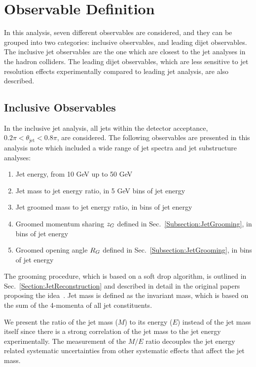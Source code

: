 \section{Observable Definition}\label{Section:Observable}

In this analysis, seven different observables are considered, and they can be grouped into two categories: inclusive observables, and leading dijet observables. The inclusive jet observables are the one which are closest to the jet analyses in the hadron colliders. The leading dijet observables, which are less sensitive to jet resolution effects experimentally compared to leading jet analysis, are also described. %

\subsection{Inclusive Observables}

In the inclusive jet analysis, all jets within the detector acceptance, $0.2\pi < \theta_\text{jet} < 0.8\pi$, are considered. The following observables are presented in this analysis note which included a wide range of jet spectra and jet substructure analyses:
%
\begin{enumerate}
    \item Jet energy, from 10 GeV up to 50 GeV
    \item Jet mass to jet energy ratio, in 5 GeV bins of jet energy
    \item Jet groomed mass to jet energy ratio, in bins of jet energy
    \item Groomed momentum sharing $z_G$ defined in Sec.~\ref{Subsection:JetGrooming}, in bins of jet energy
    \item Groomed opening angle $R_G$ defined in Sec.~\ref{Subsection:JetGrooming}, in bins of jet energy
\end{enumerate}
%
The grooming procedure, which is based on a soft drop algorithm, is outlined in Sec.~\ref{Section:JetReconstruction} and described in detail in the original papers proposing the idea~\cite{Larkoski:2014wba}.  Jet mass is defined as the invariant mass, which is based on the sum of the 4-momenta of all jet constituents.

We present the ratio of the jet mass ($M$) to its energy ($E$) instead of the jet mass itself since there is a strong correlation of the jet mass to the jet energy experimentally.  The measurement of the $M/E$ ratio decouples the jet energy related systematic uncertainties from other systematic effects that affect the jet mass.

